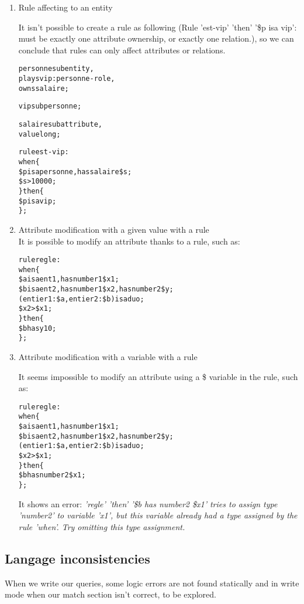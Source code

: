 \documentclass{article}
\begin{document}
\begin{enumerate}
\item Rule affecting to an entity

It isn't possible to create a rule as following (Rule 'est-vip' 'then' '\$p isa vip': must be exactly one attribute ownership, or exactly one relation.), so we can conclude that rules can only affect attributes or relations.
\begin{alltt}
personne sub entity,
    plays vip:personne-role,
    owns salaire;
    
vip sub personne;

salaire sub attribute,
  value long;

rule est-vip:
when \{
  \$p isa personne, has salaire \$s;
  \$s > 10000;
\} then \{
 \$p isa vip;
\};
\end{alltt}


\item Attribute modification with a given value with a rule \\
It is possible to modify an attribute thanks to a rule, such as:
\begin{alltt}
rule regle:
when \{
  \$a isa ent1, has number1 \$x1;
  \$b isa ent2, has number1 \$x2, has number2 \$y;
  (entier1 : \$a , entier2 : \$b ) isa duo;
  \$x2 > \$x1;
\} then \{
 \$b has y 10;
\};
\end{alltt}


\item Attribute modification with a variable with a rule

It seems impossible to modify an attribute using a \$ variable in the rule, such as:
\begin{alltt}
rule regle:
when \{
  \$a isa ent1, has number1 \$x1;
  \$b isa ent2, has number1 \$x2, has number2 \$y;
  (entier1 : \$a , entier2 : \$b ) isa duo;
  \$x2 > \$x1;
\} then \{
 \$b has number2 \$x1;
\};
\end{alltt}

It shows an error: \emph{'regle' 'then' '\$b has number2 \$x1' tries to assign type 'number2' to variable 'x1', but this variable already had a type assigned by the rule 'when'. Try omitting this type assignment.}

\end{enumerate}

\subsection{Langage inconsistencies}

When we write our queries, some logic errors are not found statically and in write mode when our match section isn't correct, to be explored.

























\end{document}
